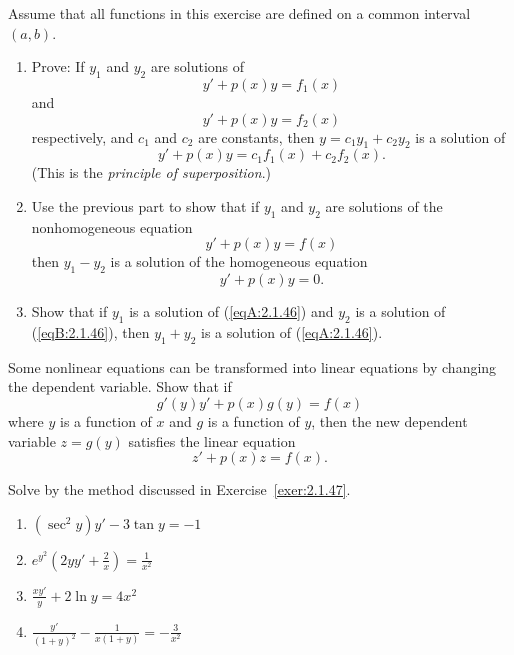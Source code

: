 \documentclass{ximera}
\begin{document}
\begin{problem}\label{exer:2.1.46}
Assume that all functions in this exercise are defined on
a common interval $(a,b)$.
\begin{enumerate}
\item %
Prove:  If $y_1$ and $y_2$ are solutions of
$$
y'+p(x)y=f_1(x)
$$
and
$$
y'+p(x)y=f_2(x)
$$
respectively, and $c_1$ and $c_2$ are constants, then
$y=c_1y_1+c_2y_2$ is a solution of
$$
y'+p(x)y=c_1f_1(x)+c_2f_2(x).
$$
(This is the \emph{principle of superposition}.)

\item %
Use the previous part to show that if $y_1$ and $y_2$ are solutions
of the nonhomogeneous equation
\begin{equation}\label{eqA:2.1.46}
y'+p(x)y=f(x)
\end{equation}
then $y_1-y_2$ is a solution of the homogeneous equation
\begin{equation}\label{eqB:2.1.46}
y'+p(x)y=0.
\end{equation}

\item %
Show that if $y_1$ is a solution of
(\ref{eqA:2.1.46}) and $y_2$ is a solution of
(\ref{eqB:2.1.46}), then $y_1+y_2$ is a solution of
(\ref{eqA:2.1.46}).
\end{enumerate}
\end{problem}

\begin{problem}\label{exer:2.1.47}
Some nonlinear equations can be transformed into linear
equations by changing the dependent variable.  Show that if
$$
g'(y)y'+p(x)g(y)=f(x)
$$
where $y$ is a function of $x$ and $g$ is a function of $y$,
then the new dependent variable $z=g(y)$ satisfies the
linear equation
$$
z'+p(x)z=f(x).
$$
\end{problem}

\begin{problem}\label{exer:2.1.48}
Solve by the method discussed in Exercise~\ref{exer:2.1.47}.

\begin{enumerate} 
\item 
$(\sec^2y)y'- 3\tan y=-1$

\item 
$e^{y^2}\left(2yy'+\frac{2}{x}\right) =\frac{1}{x^2}$

\item 
$\frac{xy'}{y} + 2\ln y=4x^2$

\item 
$\frac{y'}{(1+y)^2} -\frac{1}{x(1+y)}=-\frac{3}{x^2}$
\end{enumerate}
\end{problem}
\end{document}
